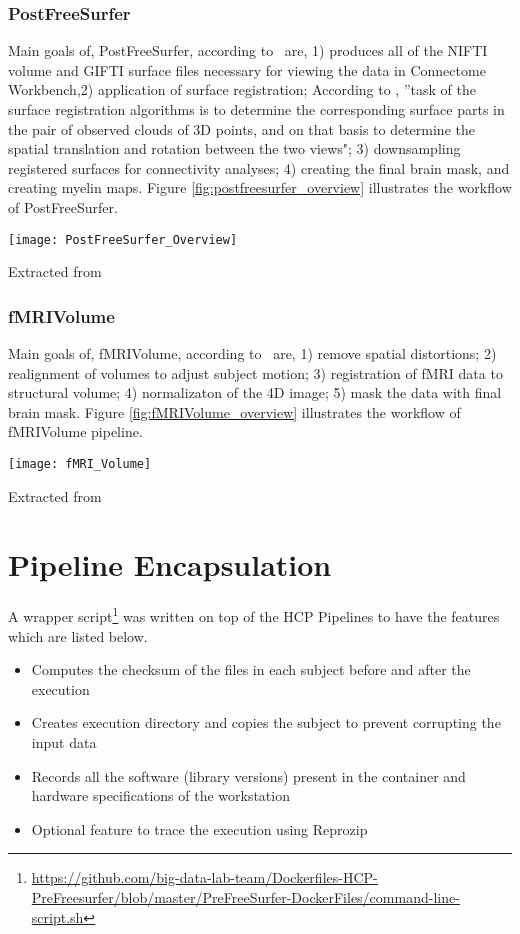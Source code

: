 \subsubsection{PostFreeSurfer}
Main goals of, PostFreeSurfer, according to~\cite{Gla13} are, 1) produces all of the NIFTI volume and GIFTI surface files necessary for viewing the data in Connectome Workbench,2) application of surface registration; According to \cite{DBLP:journals/corr/HrgeticP13}, ''task of the surface registration algorithms is to determine the corresponding surface parts in the pair of observed clouds of 3D points, and on that basis to determine the spatial translation and rotation between the two views"; 3) downsampling registered surfaces for connectivity analyses; 4) creating the final brain mask, and creating myelin maps. Figure \ref{fig:postfreesurfer_overview} illustrates the workflow of PostFreeSurfer.\\

\begin{center}
  \texttt{[image: PostFreeSurfer\_Overview]}
  \label{fig:postfreesurfer_overview}
  \caption*{Extracted from \cite{Gla13}}
\end{center}

\subsubsection{fMRIVolume}
Main goals of, fMRIVolume, according to~\cite{Gla13} are, 1) remove spatial distortions; 2) realignment of volumes to adjust subject motion; 3) registration of fMRI data to structural volume; 4) normalizaton of the 4D image; 5) mask the data with final brain mask. Figure \ref{fig:fMRIVolume_overview} illustrates the workflow of fMRIVolume pipeline.\\

\begin{center}
  \texttt{[image: fMRI\_Volume]}
  \label{fig:fMRIVolume_overview}
  \caption*{Extracted from \cite{Gla13}}
\end{center}

\section{Pipeline Encapsulation}
A wrapper script\footnote{\url{https://github.com/big-data-lab-team/Dockerfiles-HCP-PreFreesurfer/blob/master/PreFreeSurfer-DockerFiles/command-line-script.sh}} was written on top of the HCP Pipelines to have the features which are listed below. 
\begin{itemize}
  \item Computes the checksum of the files in each subject before and after the execution
  \item Creates execution directory and copies the subject to prevent corrupting the input data
  \item Records all the software (library versions) present in the container and hardware specifications of the workstation
  \item Optional feature to trace the execution using Reprozip
\end{itemize}

